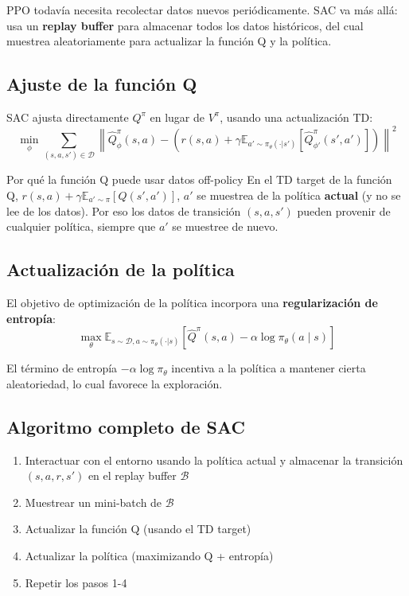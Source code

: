 \documentclass[a4paper]{article}
\begin{document}
PPO todavía necesita recolectar datos nuevos periódicamente. SAC va más allá: usa un \textbf{replay buffer} para almacenar todos los datos históricos, del cual muestrea aleatoriamente para actualizar la función Q y la política.

\subsection{Ajuste de la función Q}

SAC ajusta directamente $Q^\pi$ en lugar de $V^\pi$, usando una actualización TD:
$$\min_\phi \sum_{(s,a,s') \in \mathcal{D}} \left\| \hat{Q}^\pi_\phi(s, a) - \left(r(s,a) + \gamma \mathbb{E}_{a' \sim \pi_\theta(\cdot|s')}\left[\hat{Q}^\pi_{\phi'}(s', a')\right]\right)\right\|^2$$

\begin{knowledgebox}{Por qué la función Q puede usar datos off-policy}
En el TD target de la función Q, $r(s,a) + \gamma \mathbb{E}_{a' \sim \pi}\left[Q(s', a')\right]$, $a'$ se muestrea de la política \textbf{actual} (y no se lee de los datos). Por eso los datos de transición $(s, a, s')$ pueden provenir de cualquier política, siempre que $a'$ se muestree de nuevo.
\end{knowledgebox}

\subsection{Actualización de la política}

El objetivo de optimización de la política incorpora una \textbf{regularización de entropía}:
$$\max_\theta \mathbb{E}_{s \sim \mathcal{D}, a \sim \pi_\theta(\cdot|s)} \left[\hat{Q}^\pi(s, a) - \alpha \log \pi_\theta(a \mid s)\right]$$

El término de entropía $-\alpha \log \pi_\theta$ incentiva a la política a mantener cierta aleatoriedad, lo cual favorece la exploración.

\subsection{Algoritmo completo de SAC}

\begin{enumerate}
    \item Interactuar con el entorno usando la política actual y almacenar la transición $(s, a, r, s')$ en el replay buffer $\mathcal{B}$
    \item Muestrear un mini-batch de $\mathcal{B}$
    \item Actualizar la función Q (usando el TD target)
    \item Actualizar la política (maximizando Q + entropía)
    \item Repetir los pasos 1-4
\end{enumerate}
\end{document}

